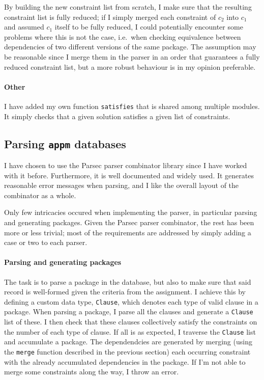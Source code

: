  By building the new constraint list from scratch, I make sure that the resulting constraint list is fully reduced; if I simply merged each constraint of $c_2$ into $c_1$ and assumed $c_1$ itself to be fully reduced, I could potentially encounter some problems where this is not the case, i.e.\ when checking equivalence between dependencies of two different versions of the same package. The assumption may be reasonable since I merge them in the parser in an order that guarantees a fully reduced constraint list, but a more robust behaviour is in my opinion preferable.

 \paragraph{Other} I have added my own function \texttt{satisfies} that is shared among multiple modules. It simply checks that a given solution satisfies a given list of constraints.

\subsection*{Parsing \texttt{appm} databases}
I have chosen to use the Parsec parser combinator library since I have worked with it before. Furthermore, it is well documented and widely used. It generates reasonable error messages when parsing, and I like the overall layout of the combinator as a whole.

Only few intricacies occured when implementing the parser, in particular parsing and generating packages. Given the Parsec parser combinator, the rest has been more or less trivial; most of the requirements are addressed by simply adding a case or two to each parser.

\paragraph{Parsing and generating packages} The task is to parse a package in the database, but also to make sure that said record is well-formed given the criteria from the assignment. I achieve this by defining a custom data type, \texttt{Clause}, which denotes each type of valid clause in a package. When parsing a package, I parse all the clauses and generate a \texttt{Clause} list of these. I then check that these clauses collectively satisfy the constraints on the number of each type of clause. If all is as expected, I traverse the \texttt{Clause} list and accumulate a package. The dependendcies are generated by merging (using the \texttt{merge} function described in the previous section) each occurring constraint with the already accumulated dependencies in the package. If I'm not able to merge some constraints along the way, I throw an error.

